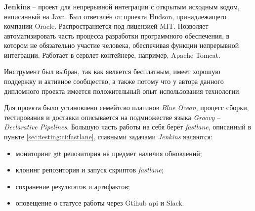 \subsubsection{}
\label{sec:testing:ci:jenkins}

\textbf{Jenkins} -- проект для непрерывной интеграции с открытым исходным кодом, написанный на Java. Был ответвлён от проекта Hudson, принадлежащего компании Oracle. Распространяется под лицензией MIT. Позволяет автоматизировать часть процесса разработки программного обеспечения, в котором не обязательно участие человека, обеспечивая функции непрерывной интеграции. Работает в сервлет-контейнере, например, Apache Tomcat\cite{wiki:jenkins}.

Инструмент был выбран, так как является бесплатным, имеет хорошую поддержку и активное сообщество, а также потому что у автора данного дипломного проекта имеется положительный опыт использования технологии.

Для проекта было установлено семейтсво плагинов \textit{Blue Ocean}, процесс сборки, тестирования и доставки описывается на подмножестве языка \textit{Groovy} -- \textit{Declarative Pipelines}. Большую часть работы на себя берёт \textit{fastlane}, описанный в пункте \ref{sec:testing:ci:fastlane}, главными задачами \textit{Jenkins} являются:

\begin{itemize}
	\item мониторинг git репозитория на предмет наличия обновлений;
	\item клонинг репозитория и запуск скриптов \textit{fastlane};
	\item сохранение результатов и артифактов;
	\item оповещение о статусе работы через Gtihub \gls{api} и Slack.
\end{itemize}